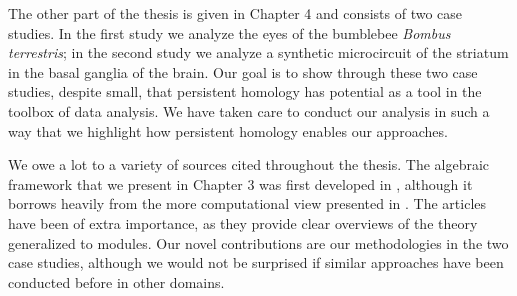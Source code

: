 The other part of the thesis is given in Chapter 4 and consists of two case studies. In the first study we analyze the eyes of the bumblebee \textit{Bombus terrestris}; in the second study we analyze a synthetic microcircuit of the striatum in the basal ganglia of the brain. Our goal is to show through these two case studies, despite small, that persistent homology has potential as a tool in the toolbox of data analysis. We have taken care to conduct our analysis in such a way that we highlight how persistent homology enables our approaches.

We owe a lot to a variety of sources cited throughout the thesis. The algebraic framework that we present in Chapter 3 was first developed in \cite{Zomorodian2005}, although it borrows heavily from the more computational view presented in \cite{edelszom}. The articles \cite{vejdemo,skraba} have been of extra importance, as they provide clear overviews of the theory generalized to modules. Our novel contributions are our methodologies in the two case studies, although we would not be surprised if similar approaches have been conducted before in other domains.


